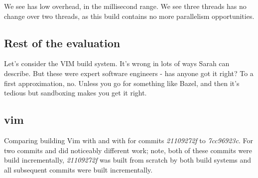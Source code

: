 We see \Rattle has low overhead, in the millisecond range. We see three threads has no change over two threads, as this build contains no more parallelism opportunities.

\subsection{Rest of the evaluation}

Let's consider the VIM build system. It's wrong in lots of ways Sarah can describe. But these were expert software engineers - has anyone got it right? To a first approximation, no. Unless you go for something like Bazel, and then it's tedious but sandboxing makes you get it right.



\subsection{vim}

Comparing building Vim \cite{} with \Make and with \Rattle for commits \emph{21109272f} to \emph{7cc96923c}.  For two commits \Make and \Rattle did noticeably different work; note, both of these commits were build incrementally, \emph{21109272f} was built from scratch by both build systems and all subsequent commits were built incrementally.

